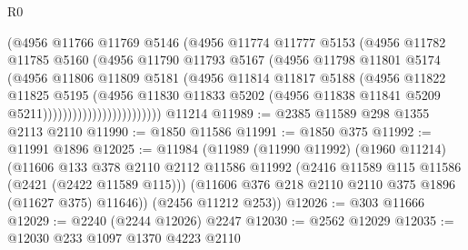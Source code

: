 \begin{lexlean}{R0}
\begin{coremodule}
                                (@4956
                                  @11766
                                  @11769
                                  @5146
                                  (@4956
                                    @11774
                                    @11777
                                    @5153
                                    (@4956
                                      @11782
                                      @11785
                                      @5160
                                      (@4956
                                        @11790
                                        @11793
                                        @5167
                                        (@4956
                                          @11798
                                          @11801
                                          @5174
                                          (@4956
                                            @11806
                                            @11809
                                            @5181
                                            (@4956
                                              @11814
                                              @11817
                                              @5188
                                              (@4956
                                                @11822
                                                @11825
                                                @5195
                                                (@4956
                                                  @11830
                                                  @11833
                                                  @5202
                                                  (@4956
                                                    @11838
                                                    @11841
                                                    @5209
                                                    @5211))))))))))))))))))))))))
    @11214
@11989 := @2385 @11589 @298 @1355 @2113 @2110
@11990 := @1850 @11586
@11991 := @1850 @375
@11992 := @11991 @1896
@12025 := @11984
    (@11989
      (@11990 @11992)
      (@1960 @11214)
      (@11606
        @133
        @378
        @2110
        @2112
        @11586
        @11992
        (@2416 @11589 @115 @11586 (@2421 (@2422 @11589 @115)))
        (@11606 @376 @218 @2110 @2110 @375 @1896 (@11627 @375) @11646))
      (@2456 @11212 @253))
@12026 := @303 @11666
@12029 := @2240 (@2244 @12026) @2247
@12030 := @2562 @12029
@12035 := @12030 @233 @1097 @1370 @4223 @2110

\end{coremodule}
\end{lexlean}
